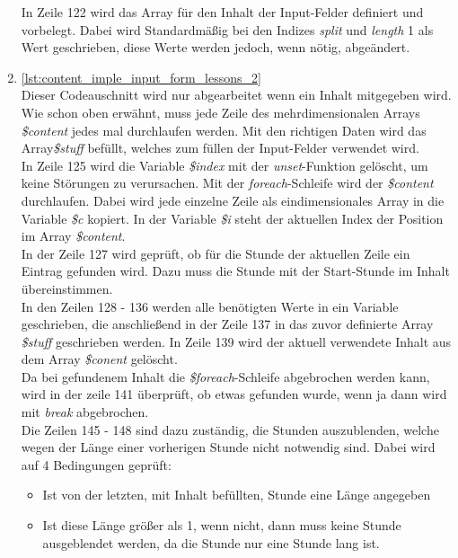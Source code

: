 \begin{enumerate}
	In Zeile 122 wird das Array für den Inhalt der Input-Felder definiert und vorbelegt. Dabei wird Standardmäßig bei den Indizes \textit{split} und \textit{length} 1 als Wert geschrieben, diese Werte werden jedoch, wenn nötig, abgeändert.\\
	
	\item \autoref{lst:content_imple_input_form_lessons_2}\\
	Dieser Codeauschnitt wird nur abgearbeitet wenn ein Inhalt mitgegeben wird. Wie schon oben erwähnt, muss jede Zeile des mehrdimensionalen Arrays \textit{\$content} jedes mal durchlaufen werden. Mit den richtigen Daten wird das Array\textit{\$stuff} befüllt, welches zum füllen der Input-Felder verwendet wird.\\
	In Zeile 125 wird die Variable \textit{\$index} mit der \textit{unset}-Funktion gelöscht, um keine Störungen zu verursachen. Mit der \textit{foreach}-Schleife wird der \textit{\$content} durchlaufen. Dabei wird jede einzelne Zeile als eindimensionales Array in die Variable \textit{\$c} kopiert. In der Variable \textit{\$i} steht der aktuellen Index der Position im Array \textit{\$content}.\\
	In der Zeile 127 wird geprüft, ob für die Stunde der aktuellen Zeile ein Eintrag gefunden wird. Dazu muss die Stunde mit der Start-Stunde  im Inhalt übereinstimmen.\\
	In den Zeilen 128 - 136 werden alle benötigten Werte in ein Variable geschrieben, die anschließend in der Zeile 137 in das zuvor definierte Array \textit{\$stuff} geschrieben werden.  In Zeile 139 wird der aktuell verwendete Inhalt aus dem Array \textit{\$conent} gelöscht.\\ Da bei gefundenem Inhalt die \textit{\$foreach}-Schleife abgebrochen werden kann, wird in der zeile 141 überprüft, ob etwas gefunden wurde, wenn ja dann wird mit \textit{break} abgebrochen.\\
	Die Zeilen 145 - 148 sind dazu zuständig, die Stunden auszublenden, welche wegen der Länge einer vorherigen Stunde nicht notwendig sind. Dabei wird auf 4 Bedingungen geprüft:
	\begin{itemize}
		\item Ist von der letzten, mit Inhalt befüllten, Stunde eine Länge angegeben
		\item Ist diese Länge größer als 1, wenn nicht, dann muss keine Stunde ausgeblendet werden, da die Stunde nur eine Stunde lang ist.

\end{itemize}
\end{enumerate}
